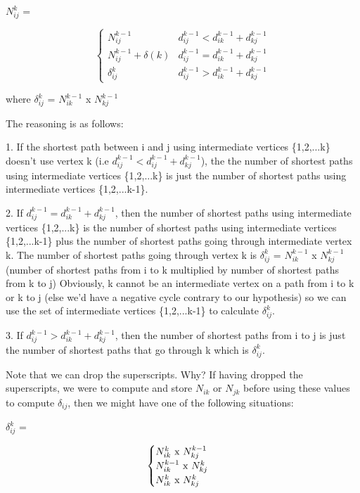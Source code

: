 \documentclass[11pt,a4paper]{article}
\begin{document}
$N_{ij}^{k}$ = 

\[ \begin{cases} 
      N_{ij}^{k-1} & d_{ij}^{k-1} < d_{ik}^{k-1} + d_{kj}^{k-1} \\
      N_{ij}^{k-1} + \delta(k) & d_{ij}^{k-1} = d_{ik}^{k-1} + d_{kj}^{k-1} \\
      \delta_{ij}^{k} & d_{ij}^{k-1} > d_{ik}^{k-1} + d_{kj}^{k-1}
   \end{cases}
\]

where $\delta_{ij}^{k}$ = $N_{ik}^{k-1}$ x $N_{kj}^{k-1}$

The reasoning is as follows:

1. If the shortest path between i and j using intermediate vertices \{1,2,...k\} doesn't use vertex k (i.e $d_{ij}^{k-1} < d_{ij}^{k-1} + d_{kj}^{k-1}$), the the number of shortest paths using intermediate vertices \{1,2,...k\} is just the number of shortest paths using intermediate vertices \{1,2,...k-1\}. 

2. If $d_{ij}^{k-1} = d_{ik}^{k-1} + d_{kj}^{k-1}$, then the number of shortest paths using intermediate vertices \{1,2,...k\} is the number of shortest paths using intermediate vertices \{1,2,...k-1\} plus the number of shortest paths going through intermediate vertex k. The number of shortest paths going through vertex k is $\delta_{ij}^{k}$ = $N_{ik}^{k-1}$ x $N_{kj}^{k-1}$ (number of shortest paths from i to k multiplied by number of shortest paths from k to j) Obviously, k cannot be an intermediate vertex on a path from i to k or k to j (else we'd have a negative cycle contrary to our hypothesis) so we can use the set of intermediate vertices \{1,2,...k-1\} to calculate $\delta_{ij}^{k}$.

3. If $d_{ij}^{k-1} > d_{ik}^{k-1} + d_{kj}^{k-1}$, then the number of shortest paths from i to j is just the number of shortest paths that go through k which is $\delta_{ij}^{k}$.

Note that we can drop the superscripts. Why? If having dropped the superscripts, we were to compute and store $N_{ik}$ or $N_{jk}$ before using these values to compute $\delta_{ij}$, then we might have one of the following situations:

$\delta_{ij}^{k}$ = 

\[ \begin{cases} 
      N_{ik}^{k}$ x $N_{kj}^{k-1} &  \\
      N_{ik}^{k-1}$ x $N_{kj}^{k} &  \\
      N_{ik}^{k}$ x $N_{kj}^{k} & 
   \end{cases}
\]
\end{document}
